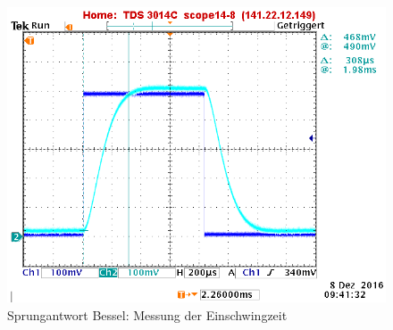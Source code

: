 \begin{figure}[h]
\centering
\includegraphics[width=0.60\linewidth]{Bilder/ImLabor/Sprungantwort_5_2_Bessel_Einschwingzeit}
\caption{Sprungantwort Bessel: Messung der Einschwingzeit}
\label{fig:Sprungantwort_5_2_Bessel_Einschwingzeit}
\end{figure}
















